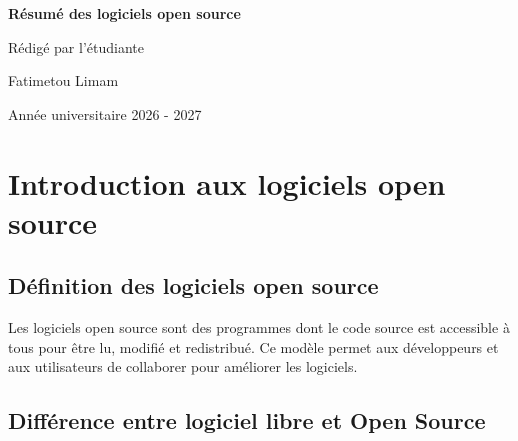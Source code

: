 \documentclass[12pt,a4paper]{report}
\begin{document}
\begin{titlepage}
    \centering

    \vspace*{2cm}

    {\Huge\bfseries Résumé des logiciels open source \par}

    \vspace{1cm}

    

    \vspace{2cm}

    {\Large Rédigé par l’étudiante \par}

    \vspace{0.5cm}

    {\Huge Fatimetou Limam \par}

    \vfill

    {\Large Année universitaire 2026 - 2027 \par}

    \vspace{1cm}

\end{titlepage}

\tableofcontents
\newpage

\chapter{Introduction aux logiciels open source}

\section{Définition des logiciels open source}

Les logiciels open source sont des programmes dont le code source est accessible à tous pour être lu, modifié et redistribué.  
Ce modèle permet aux développeurs et aux utilisateurs de collaborer pour améliorer les logiciels.

\section{Différence entre logiciel libre et Open Source}
\end{document}
